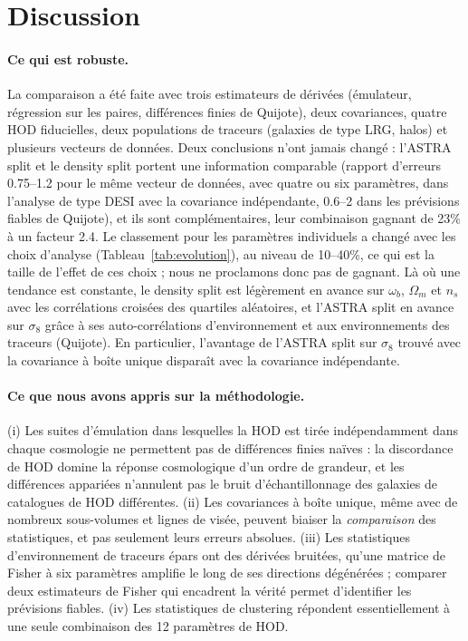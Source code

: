 \documentclass[11pt,twocolumn]{article}
\begin{document}
\section{Discussion}
\label{sec:discussion}

\paragraph{Ce qui est robuste.} La comparaison a été faite avec trois estimateurs de dérivées (émulateur, régression sur les paires, différences finies de Quijote), deux covariances, quatre HOD fiducielles, deux populations de traceurs (galaxies de type LRG, halos) et plusieurs vecteurs de données. Deux conclusions n'ont jamais changé : l'ASTRA split et le density split portent une information comparable (rapport d'erreurs 0.75--1.2 pour le même vecteur de données, avec quatre ou six paramètres, dans l'analyse de type DESI avec la covariance indépendante, 0.6--2 dans les prévisions fiables de Quijote), et ils sont complémentaires, leur combinaison gagnant de 23\% à un facteur 2.4. Le classement pour les paramètres individuels a changé avec les choix d'analyse (Tableau~\ref{tab:evolution}), au niveau de 10--40\%, ce qui est la taille de l'effet de ces choix ; nous ne proclamons donc pas de gagnant. Là où une tendance est constante, le density split est légèrement en avance sur $\omega_b$, $\Omega_m$ et $n_s$ avec les corrélations croisées des quartiles aléatoires, et l'ASTRA split en avance sur $\sigma_8$ grâce à ses auto-corrélations d'environnement et aux environnements des traceurs (Quijote). En particulier, l'avantage de l'ASTRA split sur $\sigma_8$ trouvé avec la covariance à boîte unique disparaît avec la covariance indépendante.

\paragraph{Ce que nous avons appris sur la méthodologie.} (i) Les suites d'émulation dans lesquelles la HOD est tirée indépendamment dans chaque cosmologie ne permettent pas de différences finies naïves : la discordance de HOD domine la réponse cosmologique d'un ordre de grandeur, et les différences appariées n'annulent pas le bruit d'échantillonnage des galaxies de catalogues de HOD différentes. (ii) Les covariances à boîte unique, même avec de nombreux sous-volumes et lignes de visée, peuvent biaiser la \emph{comparaison} des statistiques, et pas seulement leurs erreurs absolues. (iii) Les statistiques d'environnement de traceurs épars ont des dérivées bruitées, qu'une matrice de Fisher à six paramètres amplifie le long de ses directions dégénérées ; comparer deux estimateurs de Fisher qui encadrent la vérité permet d'identifier les prévisions fiables. (iv) Les statistiques de clustering répondent essentiellement à une seule combinaison des 12 paramètres de HOD.
\end{document}
